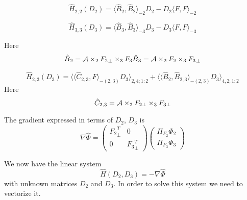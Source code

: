 
\begin{equation}
\hat{{H}}_{2,2}(D{_2}) = \langle \hat{B}{_2}, \hat{B}{_2} \rangle_{-2} D{_2} - D{_2} \langle F, F \rangle _{-2}
\end{equation}

\begin{equation}
\hat{{H}}_{3,3}(D{_3}) = \langle \hat{B}{_3}, \hat{B}{_3} \rangle_{-3} D{_3} - D{_3} \langle F, F \rangle _{-3}
\end{equation}

Here
\begin{eqnarray}
\hat{B}{_2} = \mathcal{A} \times_2 {F_2}_{\bot} \times_3 {F_3}
\hat{B}{_3} = \mathcal{A} \times_2 {F_2} \times_3 {F_3}_{\bot}
\end{eqnarray}


\begin{equation}
\hat{{H}}_{2,3}(D{_3}) = \langle \langle \hat{C}_{2,3}, F \rangle_{-(2,3)} D{_3} \rangle_{2,4;1:2} + \langle \langle \hat{B}_{2}, \hat{B}_{2,3} \rangle_{-(2,3)} D{_3} \rangle_{4,2;1:2}
\end{equation}
Here
\begin{equation}
    \hat{C}_{2,3} = \mathcal{A} \times_2 F_{2 \bot} \times_3 F_{3 \bot}
\end{equation}

The gradient expressed in terms of $D_2$, $D_3$ is
\begin{equation}
\nabla \hat{\Phi} = \begin{pmatrix}
{F_2}_{\bot}^T & 0 \\
0 & {F_3}^T_{\bot} 
\end{pmatrix} \begin{pmatrix}
\Pi_{{F_2}}\Phi{_2} \\
\Pi_{F_3} \Phi{_3}
\end{pmatrix}
\end{equation}

We now have the linear system 
\begin{equation}
\hat{{H}}(D{_2}, D{_3}) = -\nabla \hat{\Phi}
\end{equation}
with unknown matrices $D{_2}$ and $D{_3}$. In order to solve this system
we need to vectorize it.

